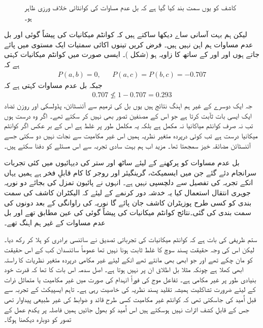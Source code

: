 \begin{figure}
\centering
{}
\caption{کاشف کو یوں سمت بند کیا گیا ہے کہ بل عدم مساوات کی کوانٹائی   خلاف ورزی   ظاہر ہو۔}
\label{شکل_بکھراو_بل_عدم_مساوات}
\end{figure}

لیکن ہم بہت آسانی ساے دیکھا ساکتے ہیں کہ کوانٹم میکانیات کی پیشاً گوئی  اور بل عدم مساوات ہم اہن نہیں ہیں۔ فرض کریں تینوں اکائی سمتیات ایک مستوی میں پائے جاتے ہوں اور  اور  کے ساتھ  کا زاویہ  ہو (شکل )۔ ایسی صورت میں کوانٹم میکانیات کہتی ہے کہ 
\begin{align*}
	P(a, b) = 0, && P(a, c) = P(b, c) = -\num{0.707}
\end{align*}
جبکہ بل عدم مساوات کہتی ہے کہ
\begin{align*}
	\num{0.707}\nleq1-\num{0.707} = \num{0.293}
\end{align*}
جہ ایک دوسرے کے غیر ہم اہنگ نتائج ہیں یوں بل کی ترمیم سے آئنسٹائن، پڈولسکی اور روزن تضاد ایک ایسی بات ثآبت کرتا ہے جو اس کے مصنفین تصور بھی نہیں کر سکتے تھے۔ اگر وہ درست ہوں تب نہ صرف کوانٹم میاکانیا نہ مکمل ہے بلکہ یہ مکلمل طور پر غلط ہے اس کے بر عکس اگر کوانٹم میکانیا درست ہے تب کوئی درپردہ متغیر نظریہ ہمیں اس غیر مکامیت سے نجات نہیں دو سکتی جسے آئنسٹائن مضائقہ خیز سمجھتا تھا۔	 مزید اب ہم بہت سادی تجربہ سے اس مسئلے کو دفنا سکتے ہیں۔

بل عدم مساوات کو پرکھنے کے لیئے ساٹھ اور ستر کی دیہائیوں میں کئی تجربات سرانجام دئے گئے جن میں ایسمیکٹ، گرینگیئر اور روجر کا کام قابلِ فخر ہے ہمیں یہاں انکے تجربہ کی تفصیل سے دلچسپی نہیں ہے۔ انہوں نے پائیون تمزل کی بجائے دو نوریہ جوہری انتقال استعمال کیا یہ خدشہ دور کرنمے کے لیئے کہ الیکٹران کاشف کی سمت بندی کو کسی طرح پوزیٹران کاشف جان پائے گا  نوریہ کی راوانگی کے بعد دونوں کی سمت بندی کی گئی۔نتائج کوانٹم میکانیات کی پیشاً گوئی کی عین مطابق تھے اور بل عدم مساوات کے غیر ہم اہنگ تھے۔

ستم ظریفی کی بات ہے کہ کوانٹم میکانیات کی تجرباتی تصدیق نے سائنسی برادری کو ہلا کر رکھ دیا۔ لیکن اس کی وجہ حقیقت پسند سوچ کا غلط ثابت ہونا نہیں تھا عموماً سائنسدان کب کے اس حقیقت کو مان چکے تھے اور جو ابھی بھی مانتے تھے انکے لیئے غیر مکامی درپردہ متغیر نظریات کا راستہ ابھی کھلا ہے چونکہ مثلا بل اطلاق ان پر نہیں ہوتا ہے۔ اصل سدمہ اس بات کا تھا کہ قدرت خود بنیادی طور پر غیر مکامی ہے۔ تفاعل موج کی فوراً انہدام کی صورت میں غیر مکامیت یا متماثل ذرات کے لیئے ضرورت تشاکلیت ہمیشہ تقلید پسند نظریہ کی خاصیت رہی ہے۔ تاہم ایسپیکٹ کے تجربہ سے قبل اُمید کی جاسکتی تھی کہ کوانٹم غیر مکامیت کسی طرح قائد و ضوابط کی غیر طبیعی پیداوار تھی جس کے قابلِ کشف اثرات نہیں ہوسکتے ہیں اس اُمید کو بھول جائیں ہمیں فاصلہ پر یکدم عمل کے تصور کو دوبارہ دیکھنا ہوگا۔

